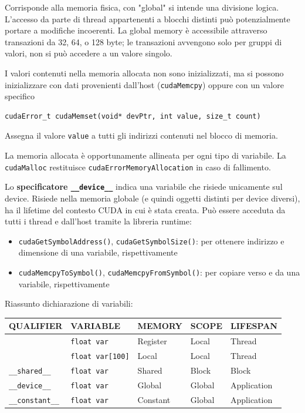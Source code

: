 Corrisponde alla memoria fisica, con "global" si intende una divisione logica. L'accesso da parte di thread appartenenti a blocchi distinti può potenzialmente portare a modifiche incoerenti. La global memory è accessibile attraverso transazioni da 32, 64, o 128 byte; le transazioni avvengono solo per gruppi di valori, non si può accedere a un valore singolo.

I valori contenuti nella memoria allocata non sono inizializzati, ma si possono inizializzare con dati provenienti dall'host (\texttt{cudaMemcpy}) oppure con un valore specifico
\begin{verbatim}
cudaError_t cudaMemset(void* devPtr, int value, size_t count)
\end{verbatim}

Assegna il valore \texttt{value} a tutti gli indirizzi contenuti nel blocco di memoria.

La memoria allocata è opportunamente allineata per ogni tipo di variabile. La \texttt{cudaMalloc} restituisce \texttt{cudaErrorMemoryAllocation} in caso di fallimento.

Lo \textbf{specificatore \texttt{\_\_device\_\_}} indica una variabile che risiede unicamente sul device. Risiede nella memoria globale (e quindi oggetti distinti per device diversi), ha il lifetime del contesto CUDA in cui è stata creata. Può essere acceduta da tutti i thread e dall'host tramite la libreria runtime:
\begin{itemize}
	\item \texttt{cudaGetSymbolAddress()}, \texttt{cudaGetSymbolSize()}: per ottenere indirizzo e dimensione di una variabile, rispettivamente
	
    \item \texttt{cudaMemcpyToSymbol()}, \texttt{cudaMemcpyFromSymbol()}: per copiare verso e da una variabile, rispettivamente
\end{itemize}

Riassunto dichiarazione di variabili: 
\begin{center}
	\begin{tabular}{|l|l|l|l|l|}
		\hline
		\textbf{QUALIFIER} & \textbf{VARIABLE} & \textbf{MEMORY} & \textbf{SCOPE} & \textbf{LIFESPAN} \\
		\hline
		& \texttt{float var} & Register & Local & Thread \\
		\hline
		& \texttt{float var[100]} & Local & Local & Thread \\
		\hline
		\texttt{\_\_shared\_\_} & \texttt{float var} & Shared & Block & Block \\
		\hline
		\texttt{\_\_device\_\_} & \texttt{float var} & Global & Global & Application \\
		\hline
		\texttt{\_\_constant\_\_} & \texttt{float var} & Constant & Global & Application \\
		\hline
	\end{tabular}
\end{center}

